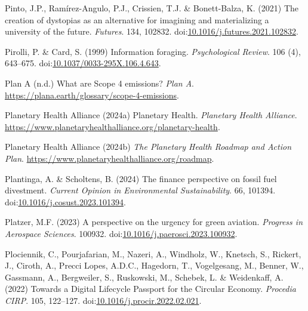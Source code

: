 \documentclass[
  letterpaper,
  DIV=11,
  numbers=noendperiod]{scrartcl}
\newlength{\cslhangindent}
\newenvironment{CSLReferences}[2] %
 {\begin{list}{}{%
  \setlength{\itemindent}{0pt}
  \setlength{\leftmargin}{0pt}
  \setlength{\parsep}{0pt}
  \ifodd #1
   \setlength{\leftmargin}{\cslhangindent}
   \setlength{\itemindent}{-1\cslhangindent}
  \fi
  \setlength{\itemsep}{#2\baselineskip}}}
 {\end{list}}
\begin{document}
\begin{CSLReferences}{0}{1}
Pinto, J.P., Ramírez-Angulo, P.J., Crissien, T.J. \& Bonett-Balza, K.
(2021) The creation of dystopias as an alternative for imagining and
materializing a university of the future. \emph{Futures}. 134, 102832.
doi:\href{https://doi.org/10.1016/j.futures.2021.102832}{10.1016/j.futures.2021.102832}.

Pirolli, P. \& Card, S. (1999) Information foraging. \emph{Psychological
Review}. 106 (4), 643--675.
doi:\href{https://doi.org/10.1037/0033-295X.106.4.643}{10.1037/0033-295X.106.4.643}.

Plan A (n.d.) What are {Scope} 4 emissions? \emph{Plan A}.
\url{https://plana.earth/glossary/scope-4-emissions}.

Planetary Health Alliance (2024a) Planetary {Health}. \emph{Planetary
Health Alliance}.
\url{https://www.planetaryhealthalliance.org/planetary-health}.

Planetary Health Alliance (2024b) \emph{The {Planetary Health Roadmap}
and {Action Plan}}.
\url{https://www.planetaryhealthalliance.org/roadmap}.

Plantinga, A. \& Scholtens, B. (2024) The finance perspective on fossil
fuel divestment. \emph{Current Opinion in Environmental Sustainability}.
66, 101394.
doi:\href{https://doi.org/10.1016/j.cosust.2023.101394}{10.1016/j.cosust.2023.101394}.

Platzer, M.F. (2023) A perspective on the urgency for green aviation.
\emph{Progress in Aerospace Sciences}. 100932.
doi:\href{https://doi.org/10.1016/j.paerosci.2023.100932}{10.1016/j.paerosci.2023.100932}.

Plociennik, C., Pourjafarian, M., Nazeri, A., Windholz, W., Knetsch, S.,
Rickert, J., Ciroth, A., Precci Lopes, A.D.C., Hagedorn, T.,
Vogelgesang, M., Benner, W., Gassmann, A., Bergweiler, S., Ruskowski,
M., Schebek, L. \& Weidenkaff, A. (2022) Towards a {Digital Lifecycle
Passport} for the {Circular Economy}. \emph{Procedia CIRP}. 105,
122--127.
doi:\href{https://doi.org/10.1016/j.procir.2022.02.021}{10.1016/j.procir.2022.02.021}.


\end{CSLReferences}
\end{document}
